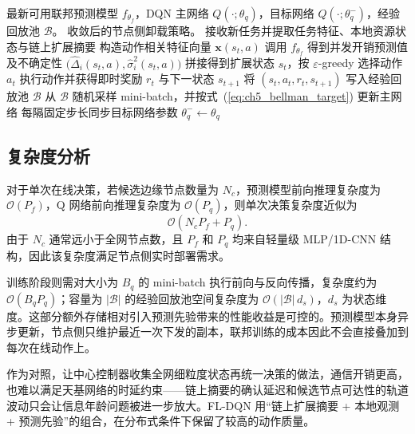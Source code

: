 \begin{algorithm}[H]
    \caption{FL-DQN 在线任务卸载决策流程}
    \label{alg:ch5_fldqn_online}
    \small
    \begin{algorithmic}[1]
        最新可用联邦预测模型 $f_{\theta_f}$，DQN 主网络 $Q(\cdot;\theta_q)$，目标网络 $Q(\cdot;\theta_q^-)$，经验回放池 $\mathcal{B}$。
        收敛后的节点侧卸载策略。
        \State 接收新任务并提取任务特征、本地资源状态与链上扩展摘要
        \State 构造动作相关特征向量 $\bm{x}(s_t,a)$
        \State 调用 $f_{\theta_f}$ 得到并发开销预测值及不确定性 $\bigl(\widehat{\Delta}_i(s_t,a),\widehat{\sigma}_i^2(s_t,a)\bigr)$
        \EndFor
        \State 拼接得到扩展状态 $s_t$，按 $\varepsilon$-greedy 选择动作 $a_t$
        \State 执行动作并获得即时奖励 $r_t$ 与下一状态 $s_{t+1}$
        \State 将 $(s_t,a_t,r_t,s_{t+1})$ 写入经验回放池 $\mathcal{B}$
        \State 从 $\mathcal{B}$ 随机采样 mini-batch，并按式~(\ref{eq:ch5_bellman_target}) 更新主网络
        \State 每隔固定步长同步目标网络参数 $\theta_q^- \leftarrow \theta_q$
        \EndIf
        \EndFor
    \end{algorithmic}
\end{algorithm}

\subsection{复杂度分析}

对于单次在线决策，若候选边缘节点数量为 $N_c$，预测模型前向推理复杂度为 $\mathcal{O}(P_f)$，Q 网络前向推理复杂度为 $\mathcal{O}(P_q)$，则单次决策复杂度近似为
\begin{equation}
    \mathcal{O}\left(N_c P_f + P_q\right).
\end{equation}
由于 $N_c$ 通常远小于全网节点数，且 $P_f$ 和 $P_q$ 均来自轻量级 MLP/1D-CNN 结构，因此该复杂度满足节点侧实时部署需求。

训练阶段则需对大小为 $B_q$ 的 mini-batch 执行前向与反向传播，复杂度约为 $\mathcal{O}(B_q P_q)$；容量为 $|\mathcal{B}|$ 的经验回放池空间复杂度为 $\mathcal{O}(|\mathcal{B}|\,d_s)$，$d_s$ 为状态维度。这部分额外存储相对引入预测先验带来的性能收益是可控的。预测模型本身异步更新，节点侧只维护最近一次下发的副本，联邦训练的成本因此不会直接叠加到每次在线动作上。

作为对照，让中心控制器收集全网细粒度状态再统一决策的做法，通信开销更高，也难以满足天基网络的时延约束——链上摘要的确认延迟和候选节点可达性的轨道波动只会让信息年龄问题被进一步放大。FL-DQN 用“链上扩展摘要 + 本地观测 + 预测先验”的组合，在分布式条件下保留了较高的动作质量。


